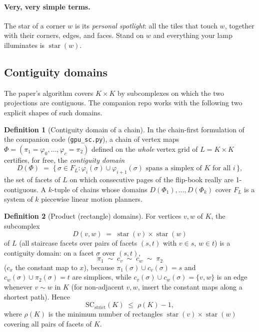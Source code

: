 \documentclass[11pt]{article}
\theoremstyle{definition}
\newtheorem{definition}{Definition}
\begin{document}
\paragraph{Very, very simple terms.}
The star of a corner $w$ is its \emph{personal spotlight}: all the tiles that
touch $w$, together with their corners, edges, and faces. Stand on $w$ and
everything your lamp illuminates is $\operatorname{star}(w)$.

\subsection{Contiguity domains}

The paper's algorithm covers $K\times K$ by subcomplexes on which the two
projections are contiguous. The companion repo works with the following two
explicit shapes of such domains.

\begin{definition}[Contiguity domain of a chain]
\label{def:cdom}
In the chain-first formulation of the companion code (\texttt{gpu\_sc.py}), a
chain of vertex maps
$\Phi = (\pi_1 = \varphi_0, \dots, \varphi_c = \pi_2)$ defined on the
\emph{whole} vertex grid of $L = K\times K$ certifies, for free, the
\emph{contiguity domain}
\[
D(\Phi) \;=\; \bigl\{\, \sigma \in F_L :
\varphi_i(\sigma) \cup \varphi_{i+1}(\sigma) \text{ spans a simplex of } K
\text{ for all } i \,\bigr\},
\]
the set of facets of $L$ on which consecutive pages of the flip-book really are
1-contiguous. A $k$-tuple of chains whose domains $D(\Phi_1), \dots, D(\Phi_k)$
cover $F_L$ is a system of $k$ piecewise linear motion planners.
\end{definition}

\begin{definition}[Product (rectangle) domains]
\label{def:rect}
For vertices $v, w$ of $K$, the subcomplex
\[
D(v, w) \;=\; \operatorname{star}(v) \times \operatorname{star}(w)
\]
of $L$ (all staircase facets over pairs of facets $(s,t)$ with $v \in s$,
$w \in t$) is a contiguity domain: on a facet $\sigma$ over $(s,t)$,
\[
\pi_1 \;\sim\; c_v \;\sim\; c_w \;\sim\; \pi_2
\]
($c_x$ the constant map to $x$), because
$\pi_1(\sigma) \cup c_v(\sigma) = s$ and
$c_w(\sigma) \cup \pi_2(\sigma) = t$ are simplices, while
$c_v(\sigma) \cup c_w(\sigma) = \{v,w\}$ is an edge whenever $v \sim w$ in $K$
(for non-adjacent $v,w$, insert the constant maps along a shortest path).
Hence
\[
\mathrm{SC}_{\mathrm{strict}}(K) \;\leq\; \rho(K) - 1,
\]
where $\rho(K)$ is the minimum number of rectangles
$\operatorname{star}(v)\times\operatorname{star}(w)$ covering all pairs of
facets of $K$.
\end{definition}
\end{document}
